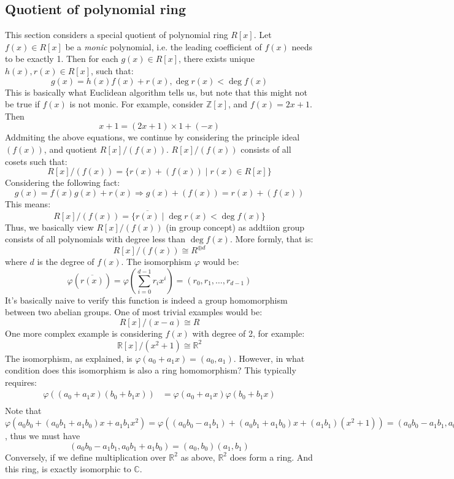 \documentclass[a4paper, pdf, 11.5pt]{article}
\begin{document}
\subsection{Quotient of polynomial ring}
This section considers a special quotient of polynomial ring $R[x]$. Let $f(x)\in R[x]$ be a 
\textit{monic} polynomial, i.e. the leading coefficient of $f(x)$ needs to be exactly 1. Then 
for each $g(x)\in R[x]$, there exists unique $h(x), r(x)\in R[x]$, such that:
$$
g(x) = h(x)f(x) + r(x), \deg r(x) < \deg f(x)
$$
This is basically what Euclidean algorithm tells us, but note that this might not 
be true if $f(x)$ is not monic. For example, consider $\mathbb{Z}[x]$, and $f(x) = 2x+1$. Then 
$$
x+1 = (2x+1) \times 1 + (-x)
$$
Addmiting the above equations, we continue by considering the principle ideal $(f(x))$, and quotient
$R[x]/(f(x))$. $R[x]/(f(x))$ consists of all cosets such that:
$$
R[x]/(f(x)) = \{r(x) + (f(x))\mid r(x)\in R[x]\}
$$
Considering the following fact: 
$$
g(x) = f(x)g(x) + r(x) \Rightarrow g(x) + (f(x)) = r(x) + (f(x))
$$
This means:
$$
R[x]/(f(x)) = \{\overline{r(x)}\mid \deg r(x) < \deg f(x)\}
$$
Thus, we basically view $R[x]/(f(x))$ (in group concept) as addtiion group 
consists of all polynomials with degree less than $\deg f(x)$. More formly, 
that is:
$$
R[x]/(f(x))\cong R^{\oplus d}
$$
where $d$ is the degree of $f(x)$. The isomorphism $\varphi$ would be:
$$
\varphi(\overline{r(x)}) = \varphi(\sum_{i=0}^{d-1}r_{i}x^{i})=(r_0, r_1,\ldots, r_{d-1})
$$
It's basically naive to verify this function is indeed a group homomorphism between two abelian groups. 
One of most trivial examples would be:
$$
R[x]/(x - a)\cong R
$$
One more complex example is considering $f(x)$ with degree of 2, for example:
$$
\mathbb{R}[x]/(x^{2} + 1) \cong \mathbb{R}^{2}
$$
The isomorphism, as explained, is $\varphi(a_0 + a_1x) = (a_0, a_1)$. However, in what 
condition does this isomorphism is also a ring homomorphism? This typically requires:
$$
\begin{aligned}
\varphi((a_0+a_1x)(b_0+b_1x)) &= \varphi(a_0+a_1x)\varphi(b_0+b_1x)\\
\end{aligned}
$$
Note that 
$
\varphi(a_0b_0 + (a_0b_1 + a_1b_0)x + a_1b_1x^{2}) = 
\varphi((a_0b_0-a_1b_1)+(a_0b_1+a_1b_0)x+(a_1b_1)(x^2+1)) = (a_0b_0-a_1b_1, a_0b_1+a_1b_0)
$, thus we must have 
$$
(a_0b_0-a_1b_1, a_0b_1+a_1b_0) = (a_0, b_0)(a_1, b_1)
$$
Conversely, if we define multiplication over $\mathbb{R}^{2}$ as above, $\mathbb{R}^{2}$ does 
form a ring. And this ring, is exactly isomorphic to $\mathbb{C}$.
\end{document}
